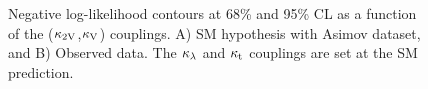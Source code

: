 \begin{figure}[ht!]
\captionsetup[subfigure]{justification=centering}
\centering
{}
\caption[Negative log-likelihood contours at 68\% and 95\% CL as a function of the ($\kvv$,$\kv$) couplings]{\label{fig:likelihood_c2V_cV_2D}Negative log-likelihood contours at 68\% and 95\% CL as a function of the ($\kvv$,$\kv$) couplings. A) SM hypothesis with Asimov dataset, and B) Observed data. The $\kappa_{\lambda}$ and $\mathrm{\kappa_{t} }$ couplings are set at the SM prediction.}
\end{figure}